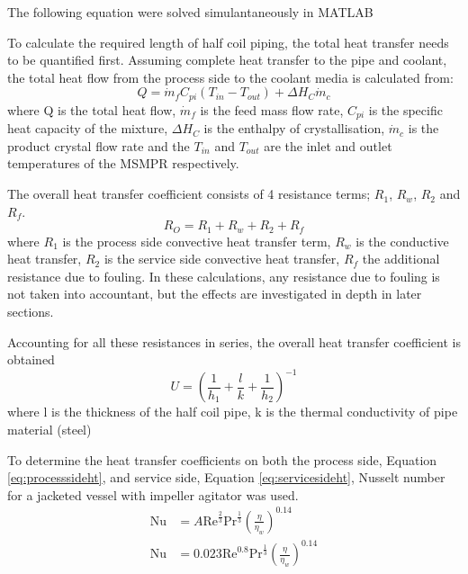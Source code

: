 The following equation were solved simulantaneously in MATLAB 


To calculate the required length of half coil piping, the total heat transfer needs to be quantified first. Assuming complete heat transfer to the pipe and coolant, the total heat flow from the process side to the coolant media is calculated from:
\begin{equation} \label{eq:energy balance}
    Q =  \Dot{m}_{f}C_{pi}(T_{in}-T_{out})+ \Delta H_{C}\Dot{m}_{c}
\end{equation}
where Q is the total heat flow, $\Dot{m}_f$ is the feed mass flow rate, $C_{pi}$ is the specific heat capacity of the mixture, $\Delta H_{C}$ is the enthalpy of crystallisation, $\Dot{m}_{c}$ is the product crystal flow rate and the $T_{in}$ and $T_{out}$ are the inlet and outlet temperatures of the MSMPR respectively.


The overall heat transfer coefficient consists of 4 resistance terms; $R_1$, $R_w$, $R_2$ and $R_f$.
\begin{equation} \label{eq:resistht}
    R_O = R_1 + R_w + R_2 + R_f
\end{equation}
where $R_1$ is the process side convective heat transfer term, $R_w$ is the conductive heat transfer, $R_2$ is the service side convective heat transfer, $R_f$ the additional resistance due to fouling. In these calculations, any resistance due to fouling is not taken into accountant, but the effects are investigated in depth in later sections. %

Accounting for all these resistances in series, the overall heat transfer coefficient is obtained  
\begin{equation} \label{eq:energy balance}
    U = \left(\frac{1}{h_1} + \frac{l}{k}   + \frac{1}{h_2 } \right)^{-1}
\end{equation}
where l is the thickness of the half coil pipe, k is the thermal conductivity of pipe material (steel)

To determine the heat transfer coefficients on both the process side, Equation \ref{eq:processsideht}, and service side, Equation \ref{eq:servicesideht}, Nusselt number for a jacketed vessel with impeller agitator was used.
\begin{align} 
    \mathrm{Nu} &= A\mathrm{Re}^{\frac{2}{3}}\mathrm{Pr}^{\frac{1}{3}}\left( \frac{\eta}{\eta_w} \right)^{0.14} \label{eq:processsideht} \\
    \mathrm{Nu} &= 0.023\mathrm{Re}^{0.8}\mathrm{Pr}^{\frac{1}{3}} \left( \frac{\eta}{\eta_w} \right)^{0.14} \label{eq:servicesideht}
\end{align}

